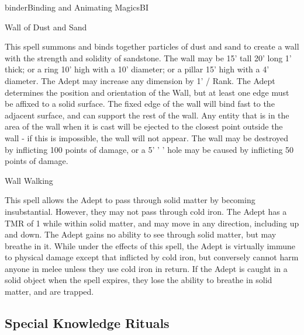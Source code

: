\begin{college}[1.1]{binder}{Binding and Animating Magics}{BI}
\begin{spell}[S-12]{Wall of Dust and Sand}
\begin{effects}
This spell summons and binds together particles of dust and sand to
create a wall with the strength and solidity of sandstone. The wall
may be 15' tall 20' long 1' thick; or a ring 10' high with a 10'
diameter; or a pillar 15' high with a 4' diameter. The Adept may
increase any dimension by 1' / Rank. The Adept determines the position
and orientation of the Wall, but at least one edge must be affixed to
a solid surface. The fixed edge of the wall will bind fast to the
adjacent surface, and can support the rest of the wall. Any entity
that is in the area of the wall when it is cast will be ejected to the
closest point outside the wall - if this is impossible, the wall will
not appear. The wall may be destroyed by inflicting 100 points of
damage, or a 5' ' ' hole may be caused by inflicting 50 points
of damage.
\end{effects}
\end{spell}

\begin{spell}[S-13]{Wall Walking}

\begin{effects}
This spell allows the Adept to pass through solid matter by becoming
insubstantial. However, they may not pass through cold iron. The Adept
has a TMR of 1 while within solid matter, and may move in any
direction, including up and down. The Adept gains no ability to see
through solid matter, but may breathe in it. While under the effects
of this spell, the Adept is virtually immune to physical damage except
that inflicted by cold iron, but conversely cannot harm anyone in
melee unless they use cold iron in return. If the Adept is caught in a
solid object when the spell expires, they lose the ability to breathe
in solid matter, and are trapped.
\end{effects}
\end{spell}

\subsection{Special Knowledge Rituals}



\end{college}
